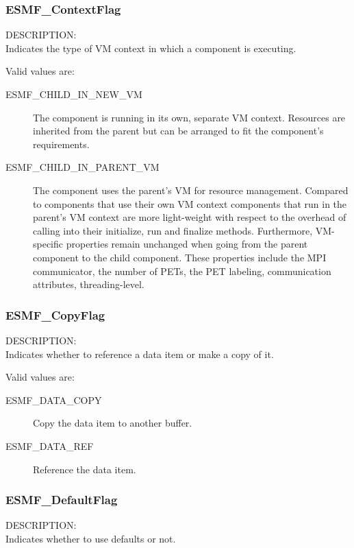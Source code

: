 \subsubsection{ESMF\_ContextFlag}
\label{opt:contextflag}
{\sf DESCRIPTION:\\}  
Indicates the type of VM context in which a component is executing.

Valid values are:
\begin{description}

\item [ESMF\_CHILD\_IN\_NEW\_VM]
         The component is running in its own, separate VM context. Resources
         are inherited from the parent but can be arranged to fit the
         component's requirements.
\item [ESMF\_CHILD\_IN\_PARENT\_VM]
         The component uses the parent's VM for resource management. Compared
         to components that use their own VM context components that run in the
         parent's VM context are more light-weight with respect to the overhead
         of calling into their initialize, run and finalize methods.
         Furthermore, VM-specific properties remain unchanged when going from
         the parent component to the child component. These properties include
         the MPI communicator, the number of PETs, the PET labeling, 
         communication attributes, threading-level.

\end{description}

\subsubsection{ESMF\_CopyFlag}
\label{opt:copyflag}
{\sf DESCRIPTION:\\}
Indicates whether to reference a data item or make a copy of it.

Valid values are:
\begin{description}
\item [ESMF\_DATA\_COPY]
      Copy the data item to another buffer.
\item [ESMF\_DATA\_REF]
      Reference the data item.
\end{description}

\subsubsection{ESMF\_DefaultFlag}
\label{opt:defaultflag}
{\sf DESCRIPTION:\\}
Indicates whether to use defaults or not.


